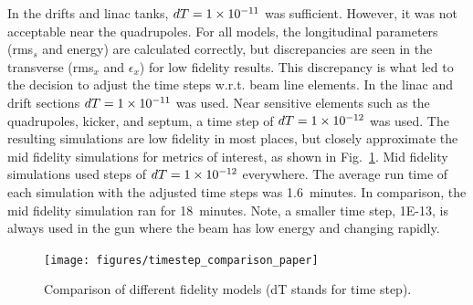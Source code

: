 In the drifts and linac tanks, $dT=\num{1E-11}$ was sufficient. 
However, it was not acceptable near the quadrupoles. 
For all models, the longitudinal parameters (rms$_s$ and energy) 
are calculated correctly, but discrepancies are seen in the transverse 
(rms$_x$ and $\epsilon_x$) for low fidelity results. This discrepancy is 
what led to the decision to adjust the time steps w.r.t. beam line elements. 
In the linac and drift sections $dT=\num{1E-11}$ was used. 
Near sensitive elements such as the quadrupoles, kicker, and septum, 
a time step of $dT=\num{1E-12}$ was used.
The resulting simulations are low fidelity in most places, but closely approximate 
the mid fidelity simulations for metrics of interest, as shown in 
Fig.~\ref{tstep}.  Mid fidelity simulations used steps of  $dT=\num{1E-12}$ everywhere.
The average run time of each simulation with the adjusted time steps was 1.6~minutes.
In comparison, the mid fidelity simulation ran for 18~minutes.
Note, a smaller time step, \num{1E-13}, is always used in the gun where the 
beam has low energy and changing rapidly.

\begin{figure}%
	\centering
	\texttt{[image: figures/timestep\_comparison\_paper]}
	\caption{Comparison of different fidelity models (dT stands for time step).}
	\label{tstep}
\end{figure}

